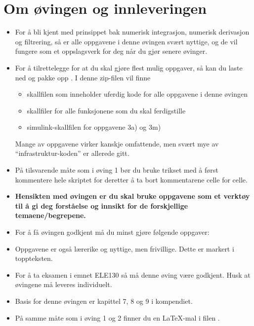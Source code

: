 \section*{Om øvingen og innleveringen}

\begin{boxedminipage}{\textwidth}
    \begin{itemize}
      \setlength\itemsep{0mm}
    \item For å bli kjent med prinsippet bak numerisk integrasjon,
      numerisk derivasjon og filtrering, 
      så er alle oppgavene i denne øvingen svært nyttige,
      og de vil fungere som et oppslagsverk for deg når du gjør senere
      øvinger.


  \item For å tilrettelegge for at du skal gjøre flest mulig oppgaver,
    så kan du laste ned og pakke opp .
    I denne zip-filen vil finne
    \begin{itemize}
    \item  skallfilen 
      som inneholder uferdig kode for alle oppgavene i denne øvingen
    \item  skallfiler for alle funksjonene som du skal ferdigstille
    \item simulink-skallfilen 
      for oppgavene 3a) og 3m)
    \end{itemize}
    Mange av oppgavene virker kanskje omfattende, men svært
    mye av ``infrastruktur-koden'' er allerede
    gitt.

 \item   På tilsvarende måte som i øving 1 bør du bruke trikset
    med å først kommentere hele skriptet 
    for deretter å ta bort
    kommentarene celle for celle. 

    \item {\bf Hensikten med   øvingen er du skal bruke
      oppgavene som et verktøy til å gi deg forståelse og innsikt for
      de forskjellige temaene/begrepene.}


  \item   {\color{red}  For å få øvingen godkjent må du minst
      gjøre følgende oppgaver:\\
      }

      \item   Oppgavene     er
        også lærerike og nyttige, men frivillige. Dette er markert i toppteksten.

\item   {\color{red}  For å ta eksamen i emnet  ELE130 så må denne øving være
  godkjent. Husk at øvingene må leveres individuelt.}

  \item Basis for denne øvingen er
    {\color{blue} kapittel 7, 8 og 9} i kompendiet.

    \item På samme måte som i øving 1 og 2 finner du en {\LaTeX}-mal i filen 
    .

  \end{itemize}
  \end{boxedminipage}

  
  



